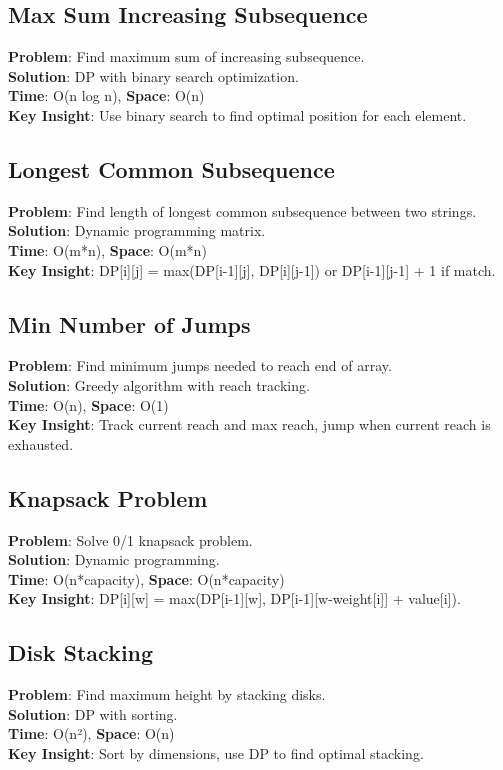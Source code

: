\documentclass{report}
\begin{document}
\subsection{Max Sum Increasing Subsequence}
\textbf{Problem}: Find maximum sum of increasing subsequence.\\
\textbf{Solution}: DP with binary search optimization.\\
\textbf{Time}: O(n log n), \textbf{Space}: O(n)\\
\textbf{Key Insight}: Use binary search to find optimal position for each element.

\subsection{Longest Common Subsequence}
\textbf{Problem}: Find length of longest common subsequence between two strings.\\
\textbf{Solution}: Dynamic programming matrix.\\
\textbf{Time}: O(m*n), \textbf{Space}: O(m*n)\\
\textbf{Key Insight}: DP[i][j] = max(DP[i-1][j], DP[i][j-1]) or DP[i-1][j-1] + 1 if match.

\subsection{Min Number of Jumps}
\textbf{Problem}: Find minimum jumps needed to reach end of array.\\
\textbf{Solution}: Greedy algorithm with reach tracking.\\
\textbf{Time}: O(n), \textbf{Space}: O(1)\\
\textbf{Key Insight}: Track current reach and max reach, jump when current reach is exhausted.

\subsection{Knapsack Problem}
\textbf{Problem}: Solve 0/1 knapsack problem.\\
\textbf{Solution}: Dynamic programming.\\
\textbf{Time}: O(n*capacity), \textbf{Space}: O(n*capacity)\\
\textbf{Key Insight}: DP[i][w] = max(DP[i-1][w], DP[i-1][w-weight[i]] + value[i]).

\subsection{Disk Stacking}
\textbf{Problem}: Find maximum height by stacking disks.\\
\textbf{Solution}: DP with sorting.\\
\textbf{Time}: O(n²), \textbf{Space}: O(n)\\
\textbf{Key Insight}: Sort by dimensions, use DP to find optimal stacking.
\end{document}
